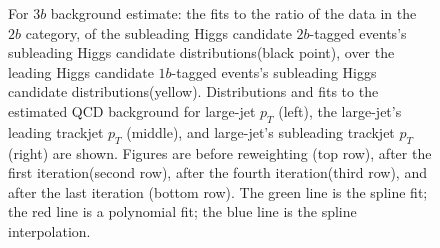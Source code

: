 \begin{figure}[htbp!]
\begin{center}
\caption{For $3b$ background estimate: the fits to the ratio of the data in the $2b$ category, of the subleading Higgs candidate $2b$-tagged events's subleading Higgs candidate distributions(black point), over the leading Higgs candidate $1b$-tagged events's subleading Higgs candidate distributions(yellow). Distributions and fits to the estimated QCD background for large-\R jet $p_{T}$ (left),  the large-\R jet's leading trackjet $p_T$ (middle), and large-\R jet's subleading trackjet $p_T$ (right) are shown.  Figures are before reweighting (top row), after the first iteration(second row), after the fourth iteration(third row), and after the last iteration (bottom row). The green line is the spline fit; the red line is a polynomial fit; the blue line is the spline interpolation.}
\label{fig:rw-3b-lead}
\end{center}
\end{figure}

